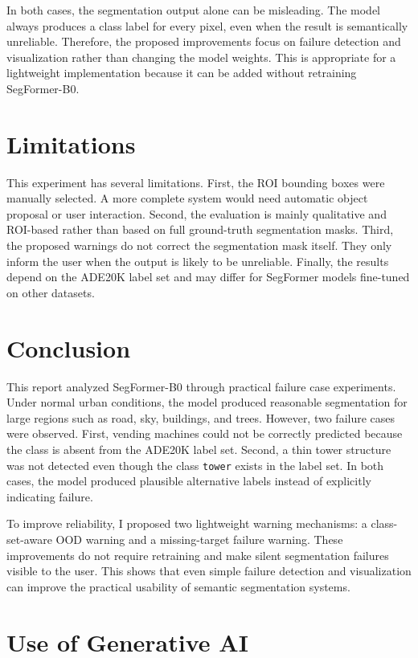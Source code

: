 \documentclass[10pt,a4paper]{article}
\begin{document}
In both cases, the segmentation output alone can be misleading.
The model always produces a class label for every pixel, even when the result is semantically unreliable.
Therefore, the proposed improvements focus on failure detection and visualization rather than changing the model weights.
This is appropriate for a lightweight implementation because it can be added without retraining SegFormer-B0.

\section{Limitations}

This experiment has several limitations.
First, the ROI bounding boxes were manually selected.
A more complete system would need automatic object proposal or user interaction.
Second, the evaluation is mainly qualitative and ROI-based rather than based on full ground-truth segmentation masks.
Third, the proposed warnings do not correct the segmentation mask itself.
They only inform the user when the output is likely to be unreliable.
Finally, the results depend on the ADE20K label set and may differ for SegFormer models fine-tuned on other datasets.

\section{Conclusion}

This report analyzed SegFormer-B0 through practical failure case experiments.
Under normal urban conditions, the model produced reasonable segmentation for large regions such as road, sky, buildings, and trees.
However, two failure cases were observed.
First, vending machines could not be correctly predicted because the class is absent from the ADE20K label set.
Second, a thin tower structure was not detected even though the class \texttt{tower} exists in the label set.
In both cases, the model produced plausible alternative labels instead of explicitly indicating failure.

To improve reliability, I proposed two lightweight warning mechanisms: a class-set-aware OOD warning and a missing-target failure warning.
These improvements do not require retraining and make silent segmentation failures visible to the user.
This shows that even simple failure detection and visualization can improve the practical usability of semantic segmentation systems.

\section{Use of Generative AI}
\end{document}
